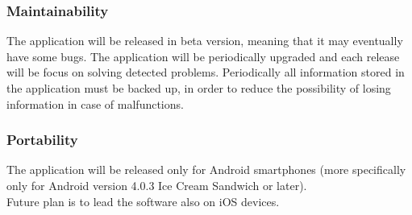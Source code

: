 \subsubsection{Maintainability}
The application will be released in beta version, meaning that it may eventually have some bugs. The application will be periodically upgraded and each release will be focus on solving detected problems.
Periodically all information stored in the application must be backed up, in order to reduce the possibility of losing information in case of malfunctions.
\subsubsection{Portability}
The application will be released only for Android smartphones (more specifically only for Android version 4.0.3 Ice Cream Sandwich or later).\\
Future plan is to lead the software also on iOS devices.


